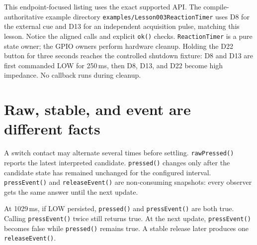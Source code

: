 \documentclass[11pt]{article}
\begin{document}
This endpoint-focused listing uses the exact supported API. The
compile-authoritative example directory
\texttt{examples/}\allowbreak\texttt{Lesson003ReactionTimer} uses D8 for the
external cue and D13 for an independent acquisition pulse, matching this
lesson. Notice the aligned calls and explicit \texttt{ok()} checks.
\texttt{ReactionTimer} is a pure state owner; the GPIO owners perform hardware
cleanup. Holding the D22 button for three seconds reaches the controlled
shutdown fixture: D8 and D13 are first commanded LOW for 250\,ms, then D8,
D13, and D22 become high impedance. No callback runs during cleanup.

\section{Raw, stable, and event are different facts}

A switch contact may alternate several times before settling.
\texttt{rawPressed()} reports the latest interpreted candidate.
\texttt{pressed()} changes only after the candidate state has remained unchanged
for the configured interval. \texttt{pressEvent()} and
\texttt{releaseEvent()} are non-consuming snapshots: every observer gets the
same answer until the next update.

\begin{center}
\end{center}

At 1029\,ms, if LOW persisted, \texttt{pressed()} and \texttt{pressEvent()} are
both true. Calling \texttt{pressEvent()} twice still returns true. At the next
update, \texttt{pressEvent()} becomes false while \texttt{pressed()} remains
true. A stable release later produces one \texttt{releaseEvent()}.
\end{document}

